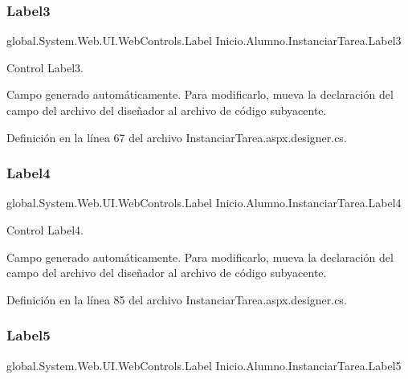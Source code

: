 \subsubsection{\texorpdfstring{Label3}{Label3}}
{\footnotesize\ttfamily global.\+System.\+Web.\+U\+I.\+Web\+Controls.\+Label Inicio.\+Alumno.\+Instanciar\+Tarea.\+Label3\hspace{0.3cm}{\ttfamily [protected]}}



Control Label3. 

Campo generado automáticamente. Para modificarlo, mueva la declaración del campo del archivo del diseñador al archivo de código subyacente. 

Definición en la línea 67 del archivo Instanciar\+Tarea.\+aspx.\+designer.\+cs.

\mbox{\label{classInicio_1_1Alumno_1_1InstanciarTarea_a3a641901193c0d2e44c4d54cd1c9a0b5}} 
\subsubsection{\texorpdfstring{Label4}{Label4}}
{\footnotesize\ttfamily global.\+System.\+Web.\+U\+I.\+Web\+Controls.\+Label Inicio.\+Alumno.\+Instanciar\+Tarea.\+Label4\hspace{0.3cm}{\ttfamily [protected]}}



Control Label4. 

Campo generado automáticamente. Para modificarlo, mueva la declaración del campo del archivo del diseñador al archivo de código subyacente. 

Definición en la línea 85 del archivo Instanciar\+Tarea.\+aspx.\+designer.\+cs.

\mbox{\label{classInicio_1_1Alumno_1_1InstanciarTarea_a9c2f576a6d6cc1378c528d55053736c4}} 
\subsubsection{\texorpdfstring{Label5}{Label5}}
{\footnotesize\ttfamily global.\+System.\+Web.\+U\+I.\+Web\+Controls.\+Label Inicio.\+Alumno.\+Instanciar\+Tarea.\+Label5\hspace{0.3cm}{\ttfamily [protected]}}



